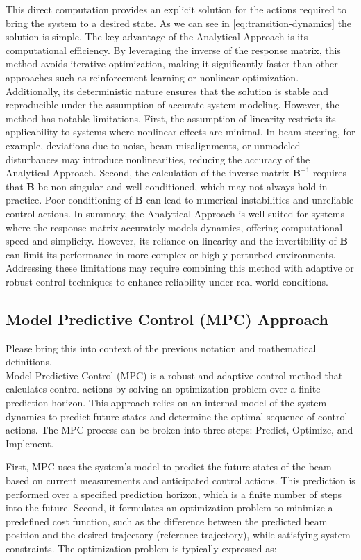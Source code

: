 \documentclass[journal,article,submit,pdftex,moreauthors]{Definitions/mdpi}
\begin{document}
This direct computation provides an explicit solution for the actions required to bring the system to a desired state.
As we can see in \cref{eq:transition-dynamics} the solution is simple.
The key advantage of the Analytical Approach is its computational efficiency. By leveraging the inverse of the response matrix, this method avoids iterative optimization, making it significantly faster than other approaches such as reinforcement learning or nonlinear optimization. Additionally, its deterministic nature ensures that the solution is stable and reproducible under the assumption of accurate system modeling. However, the method has notable limitations. First, the assumption of linearity restricts its applicability to systems where nonlinear effects are minimal. In beam steering, for example, deviations due to noise, beam misalignments, or unmodeled disturbances may introduce nonlinearities, reducing the accuracy of the Analytical Approach. Second, the calculation of the inverse matrix $\mathbf{B}^{-1}$ requires that $\mathbf{B}$ be non-singular and well-conditioned, which may not always hold in practice. Poor conditioning of $\mathbf{B}$ can lead to numerical instabilities and unreliable control actions.
In summary, the Analytical Approach is well-suited for systems where the response matrix accurately models dynamics, offering computational speed and simplicity. However, its reliance on linearity and the invertibility of $\mathbf{B}$ can limit its performance in more complex or highly perturbed environments. Addressing these limitations may require combining this method with adaptive or robust control techniques to enhance reliability under real-world conditions.
\subsection{Model Predictive Control (MPC) Approach}
Please bring this into context of the previous notation and mathematical definitions.\\
Model Predictive Control (MPC) is a robust and adaptive control method that calculates control actions by solving an optimization problem over a finite prediction horizon. This approach relies on an internal model of the system dynamics to predict future states and determine the optimal sequence of control actions. The MPC process can be broken into three steps: Predict, Optimize, and Implement.

First, MPC uses the system's model to predict the future states of the beam based on current measurements and anticipated control actions. This prediction is performed over a specified prediction horizon, which is a finite number of steps into the future. Second, it formulates an optimization problem to minimize a predefined cost function, such as the difference between the predicted beam position and the desired trajectory (reference trajectory), while satisfying system constraints. The optimization problem is typically expressed as:
\end{document}
